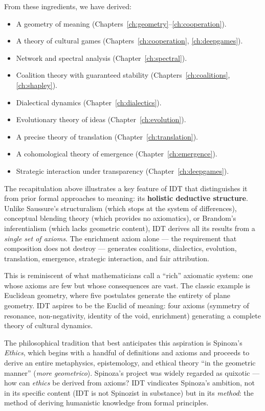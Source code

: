 From these ingredients, we have derived:
\begin{itemize}
\item A geometry of meaning (Chapters~\ref{ch:geometry}--\ref{ch:cooperation}).
\item A theory of cultural games (Chapters~\ref{ch:cooperation},
  \ref{ch:deepgames}).
\item Network and spectral analysis (Chapter~\ref{ch:spectral}).
\item Coalition theory with guaranteed stability
  (Chapters~\ref{ch:coalitions}, \ref{ch:shapley}).
\item Dialectical dynamics (Chapter~\ref{ch:dialectics}).
\item Evolutionary theory of ideas (Chapter~\ref{ch:evolution}).
\item A precise theory of translation (Chapter~\ref{ch:translation}).
\item A cohomological theory of emergence (Chapter~\ref{ch:emergence}).
\item Strategic interaction under transparency
  (Chapter~\ref{ch:deepgames}).
\end{itemize}

\begin{interpretation}
\label{interp:ch22:recapitulation_holism}
The recapitulation above illustrates a key feature of IDT that
distinguishes it from prior formal approaches to meaning: its
\textbf{holistic deductive structure}.  Unlike Saussure's structuralism
(which stops at the system of differences), conceptual blending theory
(which provides no axiomatics), or Brandom's inferentialism (which lacks
geometric content), IDT derives all its results from a \emph{single set
of axioms}.  The enrichment axiom alone --- the requirement that
composition does not destroy --- generates coalitions, dialectics,
evolution, translation, emergence, strategic interaction, and fair
attribution.

This is reminiscent of what mathematicians call a ``rich'' axiomatic
system: one whose axioms are few but whose consequences are vast.  The
classic example is Euclidean geometry, where five postulates generate
the entirety of plane geometry.  IDT aspires to be the Euclid of meaning:
four axioms (symmetry of resonance, non-negativity, identity of the void,
enrichment) generating a complete theory of cultural dynamics.

The philosophical tradition that best anticipates this aspiration is
Spinoza's \textit{Ethics}, which begins with a handful of definitions
and axioms and proceeds to derive an entire metaphysics, epistemology,
and ethical theory ``in the geometric manner'' (\textit{more geometrico}).
Spinoza's project was widely regarded as quixotic --- how can
\emph{ethics} be derived from axioms?  IDT vindicates Spinoza's
ambition, not in its specific content (IDT is not Spinozist in
substance) but in its \emph{method}: the method of deriving humanistic
knowledge from formal principles.
\end{interpretation}

